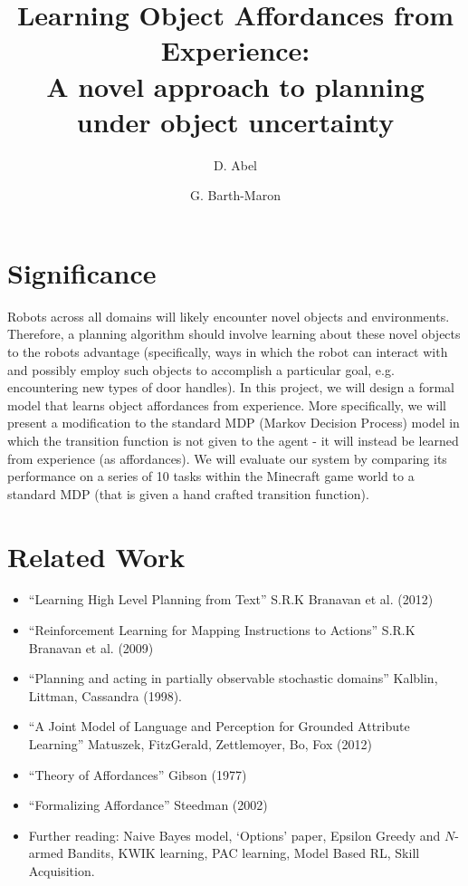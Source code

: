 \documentclass[a4paper]{article}
\title{Learning Object Affordances from Experience: \\A novel approach to planning under object uncertainty}
\author{D. Abel \and G. Barth-Maron}
\begin{document}
\maketitle


\section{Significance} Robots across all domains will likely encounter novel objects and environments. Therefore, a planning algorithm should involve learning about these novel objects to the robots advantage (specifically, ways in which the robot can interact with and possibly employ such objects to accomplish a particular goal, e.g. encountering new types of door handles). In this project, we will design a formal model that learns object affordances from experience. More specifically, we will present a modification to the standard MDP (Markov Decision Process) model in which the transition function is not given to the agent - it will instead be learned from experience (as affordances). We will evaluate our system by comparing its performance on a series of 10 tasks within the Minecraft game world to a standard MDP (that is given a hand crafted transition function).

\section{Related Work} 

\begin{itemize}
\item ``Learning High Level Planning from Text'' S.R.K Branavan et al. (2012)
\item ``Reinforcement Learning for Mapping Instructions to Actions'' S.R.K Branavan et al. (2009)
\item ``Planning and acting in partially observable stochastic domains'' Kalblin, Littman, Cassandra (1998).
\item ``A Joint Model of Language and Perception for Grounded Attribute Learning'' Matuszek, FitzGerald, Zettlemoyer, Bo, Fox (2012)
\item ``Theory of Affordances'' Gibson (1977)
\item ``Formalizing Affordance'' Steedman (2002)
\item Further reading: Naive Bayes model, `Options' paper, Epsilon Greedy and $N$-armed Bandits, KWIK learning, PAC learning, Model Based RL, Skill Acquisition.
\end{itemize}
\end{document}
